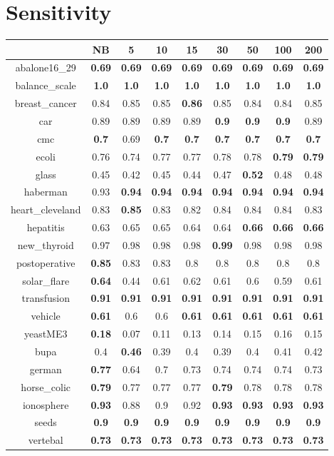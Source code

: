 \documentclass{article}%
\begin{document}
%
\section*{Sensitivity}%
\begin{tabular}{c|cccccccc}%
\hline%
&NB&5&10&15&30&50&100&200\\%
\hline%
abalone16\_29&\textbf{0.69}&\textbf{0.69}&\textbf{0.69}&\textbf{0.69}&\textbf{0.69}&\textbf{0.69}&\textbf{0.69}&\textbf{0.69}\\%
\hline%
balance\_scale&\textbf{1.0}&\textbf{1.0}&\textbf{1.0}&\textbf{1.0}&\textbf{1.0}&\textbf{1.0}&\textbf{1.0}&\textbf{1.0}\\%
\hline%
breast\_cancer&0.84&0.85&0.85&\textbf{0.86}&0.85&0.84&0.84&0.85\\%
\hline%
car&0.89&0.89&0.89&0.89&\textbf{0.9}&\textbf{0.9}&\textbf{0.9}&0.89\\%
\hline%
cmc&\textbf{0.7}&0.69&\textbf{0.7}&\textbf{0.7}&\textbf{0.7}&\textbf{0.7}&\textbf{0.7}&\textbf{0.7}\\%
\hline%
ecoli&0.76&0.74&0.77&0.77&0.78&0.78&\textbf{0.79}&\textbf{0.79}\\%
\hline%
glass&0.45&0.42&0.45&0.44&0.47&\textbf{0.52}&0.48&0.48\\%
\hline%
haberman&0.93&\textbf{0.94}&\textbf{0.94}&\textbf{0.94}&\textbf{0.94}&\textbf{0.94}&\textbf{0.94}&\textbf{0.94}\\%
\hline%
heart\_cleveland&0.83&\textbf{0.85}&0.83&0.82&0.84&0.84&0.84&0.83\\%
\hline%
hepatitis&0.63&0.65&0.65&0.64&0.64&\textbf{0.66}&\textbf{0.66}&\textbf{0.66}\\%
\hline%
new\_thyroid&0.97&0.98&0.98&0.98&\textbf{0.99}&0.98&0.98&0.98\\%
\hline%
postoperative&\textbf{0.85}&0.83&0.83&0.8&0.8&0.8&0.8&0.8\\%
\hline%
solar\_flare&\textbf{0.64}&0.44&0.61&0.62&0.61&0.6&0.59&0.61\\%
\hline%
transfusion&\textbf{0.91}&\textbf{0.91}&\textbf{0.91}&\textbf{0.91}&\textbf{0.91}&\textbf{0.91}&\textbf{0.91}&\textbf{0.91}\\%
\hline%
vehicle&\textbf{0.61}&0.6&0.6&\textbf{0.61}&\textbf{0.61}&\textbf{0.61}&\textbf{0.61}&\textbf{0.61}\\%
\hline%
yeastME3&\textbf{0.18}&0.07&0.11&0.13&0.14&0.15&0.16&0.15\\%
\hline%
bupa&0.4&\textbf{0.46}&0.39&0.4&0.39&0.4&0.41&0.42\\%
\hline%
german&\textbf{0.77}&0.64&0.7&0.73&0.74&0.74&0.74&0.73\\%
\hline%
horse\_colic&\textbf{0.79}&0.77&0.77&0.77&\textbf{0.79}&0.78&0.78&0.78\\%
\hline%
ionosphere&\textbf{0.93}&0.88&0.9&0.92&\textbf{0.93}&\textbf{0.93}&\textbf{0.93}&\textbf{0.93}\\%
\hline%
seeds&\textbf{0.9}&\textbf{0.9}&\textbf{0.9}&\textbf{0.9}&\textbf{0.9}&\textbf{0.9}&\textbf{0.9}&\textbf{0.9}\\%
\hline%
vertebal&\textbf{0.73}&\textbf{0.73}&\textbf{0.73}&\textbf{0.73}&\textbf{0.73}&\textbf{0.73}&\textbf{0.73}&\textbf{0.73}\\%
\hline%
\end{tabular}
\end{document}
